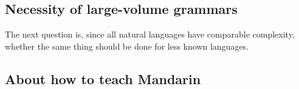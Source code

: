 \documentclass[UTF8, a4paper, oneside, scheme=plain, 12pt]{ctexrep}
\begin{document}
\subsection{Necessity of large-volume grammars}

The next question is, 
since all natural languages have comparable complexity, 
whether the same thing should be done for less known languages.

\subsection{About how to teach Mandarin}

\printbibliography[title=References]
\end{document}
